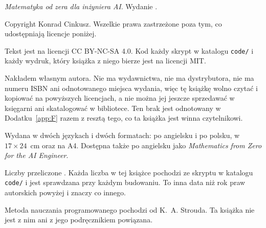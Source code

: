 
\thispagestyle{empty}
\vspace*{\fill}

{\small\color{mgrey}\raggedright\setlength{\parindent}{0pt}%
\emph{Matematyka od zera dla inżyniera AI}. Wydanie \bookedition.

\medskip
Copyright \textcopyright{} \bookyear{} Konrad Cinkusz. Wszelkie prawa
zastrzeżone poza tym, co udostępniają licencje poniżej.

\medskip
Tekst jest na licencji CC BY-NC-SA 4.0. Kod \dash{} każdy skrypt w katalogu
\texttt{code/} i każdy wydruk, który książka z niego bierze \dash{} jest na
licencji MIT.

\medskip
Nakładem własnym autora. Nie ma wydawnictwa, nie ma dystrybutora, nie ma
numeru ISBN ani odnotowanego miejsca wydania, więc tę książkę wolno czytać i
kopiować na powyższych licencjach, a nie można jej jeszcze sprzedawać w
księgarni ani skatalogować w bibliotece. Ten brak jest odnotowany w
Dodatku~\ref{app:F} razem z resztą tego, co ta książka jest winna
czytelnikowi.

\medskip
Wydana w dwóch językach i dwóch formatach: po angielsku i po polsku, w
$17 \times 24$~cm oraz na A4. Dostępna także po angielsku jako
\emph{Mathematics from Zero for the AI Engineer}.

\medskip
Liczby przeliczone \pinnedon. Każda liczba w tej książce pochodzi ze skryptu
w katalogu \texttt{code/} i jest sprawdzana przy każdym budowaniu. To inna
data niż rok praw autorskich powyżej i znaczy co innego.

\medskip
Metoda nauczania programowanego pochodzi od K.~A. Strouda. Ta książka nie
jest z nim ani z jego podręcznikiem powiązana.
\par}

\cleardoublepage
